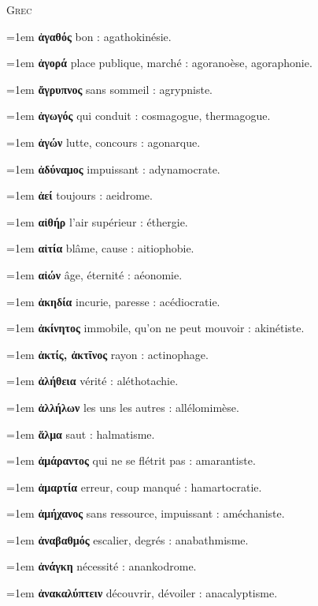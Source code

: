 {\color{rubric}\scshape Grec}\par\smallskip
\hangindent=1em \textbf{ἀγαθός} bon : agathokinésie.\par
\hangindent=1em \textbf{ἀγορά} place publique, marché : agoranoèse, agoraphonie.\par
\hangindent=1em \textbf{ἄγρυπνος} sans sommeil : agrypniste.\par
\hangindent=1em \textbf{ἀγωγός} qui conduit : cosmagogue, thermagogue.\par
\hangindent=1em \textbf{ἀγών} lutte, concours : agonarque.\par
\hangindent=1em \textbf{ἀδύναμος} impuissant : adynamocrate.\par
\hangindent=1em \textbf{ἀεί} toujours : aeidrome.\par
\hangindent=1em \textbf{αἰθήρ} l'air supérieur : éthergie.\par
\hangindent=1em \textbf{αἰτία} blâme, cause : aitiophobie.\par
\hangindent=1em \textbf{αἰών} âge, éternité : aéonomie.\par
\hangindent=1em \textbf{ἀκηδία} incurie, paresse : acédiocratie.\par
\hangindent=1em \textbf{ἀκίνητος} immobile, qu'on ne peut mouvoir : akinétiste.\par
\hangindent=1em \textbf{ἀκτίς, ἀκτῖνος} rayon : actinophage.\par
\hangindent=1em \textbf{ἀλήθεια} vérité : aléthotachie.\par
\hangindent=1em \textbf{ἀλλήλων} les uns les autres : allélomimèse.\par
\hangindent=1em \textbf{ἅλμα} saut : halmatisme.\par
\hangindent=1em \textbf{ἀμάραντος} qui ne se flétrit pas : amarantiste.\par
\hangindent=1em \textbf{ἁμαρτία} erreur, coup manqué : hamartocratie.\par
\hangindent=1em \textbf{ἀμήχανος} sans ressource, impuissant : améchaniste.\par
\hangindent=1em \textbf{ἀναβαθμός} escalier, degrés : anabathmisme.\par
\hangindent=1em \textbf{ἀνάγκη} nécessité : anankodrome.\par
\hangindent=1em \textbf{ἀνακαλύπτειν} découvrir, dévoiler : anacalyptisme.\par
